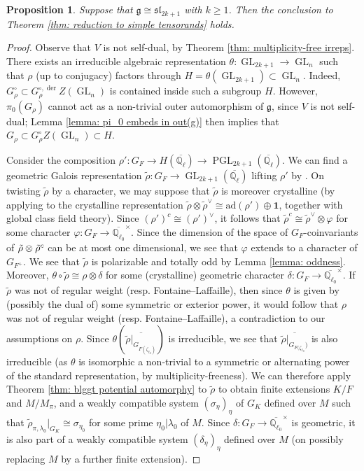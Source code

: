 \documentclass{amsart}
\newtheorem{proposition}[theorem]{Proposition}
\theoremstyle{definition}
\numberwithin{equation}{section} %
\newcommand{\GL}{\operatorname{GL}}
\newcommand{\PGL}{\operatorname{PGL}}
\newcommand{\der}{\operatorname{der}}
\newcommand{\sllie}{\mathfrak{sl}}
\newcommand{\Qlbar}{\ensuremath{\overline{\mathbb{Q}_\ell}}}
\newcommand{\Qlzerobar}{\ensuremath{\overline{\mathbb{Q}_{\ell_0}}}}
\newcommand{\mf}[1]{\mathfrak{#1}}
\newcommand{\ol}[1]{\overline{#1}}
\begin{document}
\begin{proposition} \label{prop: sl_2k+1 irred}
Suppose that $\mf{g} \cong \sllie_{2k+1}$ with $k \geq 1$.
Then the conclusion to Theorem \ref{thm: reduction to simple tensorands} holds.
\end{proposition}
\begin{proof}
Observe that $V$ is not self-dual, by Theorem \ref{thm: multiplicity-free irreps}.
There exists an irreducible algebraic representation $\theta: \GL_{2k+1} \to \GL_n$ such that $\rho$ (up to conjugacy) factors through $H = \theta(\GL_{2k+1}) \subset \GL_n$.
Indeed, $G_{\rho}^\circ \subset G_{\rho}^{\circ,\der} Z(\GL_n)$ is contained inside such a subgroup $H$.
However, $\pi_0(G_\rho)$ cannot act as a non-trivial outer automorphism of $\mf{g}$, since $V$ is not self-dual; Lemma \ref{lemma: pi_0 embeds in out(g)} then implies that $G_{\rho} \subset G_{\rho}^\circ Z(\GL_n) \subset H$.

Consider the composition $\rho': G_F \to H(\Qlbar) \to \PGL_{2k+1}(\Qlbar)$.
We can find a geometric Galois representation $\tilde{\rho}: G_F \to \GL_{2k+1}(\Qlbar)$ lifting $\rho'$ by \cite[Theorem 3.2.10]{patrikis2019variations}.
On twisting $\tilde{\rho}$ by a character, we may suppose that $\tilde{\rho}$ is moreover crystalline (by applying \cite[Theorem A.0.5]{liu2016automorphy} to the crystalline representation $\tilde{\rho} \otimes \tilde{\rho}^\vee \cong \mathrm{ad}(\rho') \oplus \mathbf{1}$, together with global class field theory).
Since $(\rho')^{c} \cong (\rho')^\vee$, it follows that $\tilde{\rho}^c \cong \tilde{\rho}^\vee \otimes \varphi$ for some character $\varphi: G_F \to \Qlzerobar^\times$.
Since the dimension of the space of $G_F$-coinvariants of $\Tilde{\rho} \otimes \Tilde{\rho}^c$ can be at most one dimensional, we see that $\varphi$ extends to a character of $G_{F^+}$.
We see that $\tilde{\rho}$ is polarizable and totally odd by Lemma \ref{lemma: oddness}.
Moreover, $\theta \circ \tilde{\rho} \cong \rho \otimes \delta$ for some (crystalline) geometric character $\delta: G_F \to \Qlzerobar^\times$.
If $\tilde{\rho}$ was not of regular weight (resp. Fontaine--Laffaille), then since $\theta$ is given by (possibly the dual of) some symmetric  or exterior power, it would follow that $\rho$ was not of regular weight (resp. Fontaine--Laffaille), a contradiction to our assumptions on $\rho$.
Since $\theta(\ol{\tilde{\rho}|_{G_{F(\zeta_{\ell_0})}}})$ is irreducible, we see that $\ol{\tilde{\rho}|_{G_{F(\zeta_{\ell_0}})}}$ is also irreducible (as $\theta$ is isomorphic a non-trivial to a symmetric or alternating power of the standard representation, by multiplicity-freeness).
We can therefore apply Theorem \ref{thm: blggt potential automorphy} to $\tilde{\rho}$ to obtain finite extensions $K/F$ and $M/M_\pi$, and a weakly compatible system $(\sigma_\eta)_\eta$ of $G_K$ defined over $M$ such that 
\(
\tilde{\rho}_{\pi,\lambda_0}|_{G_K} \cong \sigma_{\eta_0}
\)
for some prime $\eta_0|\lambda_0$ of $M$.
Since $\delta: G_F \to \Qlzerobar^\times$ is geometric, it is also part of a weakly compatible system $(\delta_\eta)_\eta$ defined over $M$ (on possibly replacing $M$ by a further finite extension).


\end{proof}
\end{document}
